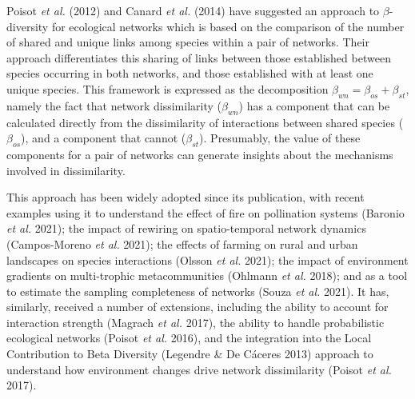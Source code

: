 \documentclass[11pt]{article}
\begin{document}
Poisot \emph{et al.} (2012) and Canard \emph{et al.} (2014) have
suggested an approach to \(\beta\)-diversity for ecological networks
which is based on the comparison of the number of shared and unique
links among species within a pair of networks. Their approach
differentiates this sharing of links between those established between
species occurring in both networks, and those established with at least
one unique species. This framework is expressed as the decomposition
\(\beta_{wn} = \beta_{os} + \beta_{st}\), namely the fact that network
dissimilarity (\(\beta_{wn}\)) has a component that can be calculated
directly from the dissimilarity of interactions between shared species
(\(\beta_{os}\)), and a component that cannot (\(\beta_{st}\)).
Presumably, the value of these components for a pair of networks can
generate insights about the mechanisms involved in dissimilarity.

This approach has been widely adopted since its publication, with recent
examples using it to understand the effect of fire on pollination
systems (Baronio \emph{et al.} 2021); the impact of rewiring on
spatio-temporal network dynamics (Campos-Moreno \emph{et al.} 2021); the
effects of farming on rural and urban landscapes on species interactions
(Olsson \emph{et al.} 2021); the impact of environment gradients on
multi-trophic metacommunities (Ohlmann \emph{et al.} 2018); and as a
tool to estimate the sampling completeness of networks (Souza \emph{et
al.} 2021). It has, similarly, received a number of extensions,
including the ability to account for interaction strength (Magrach
\emph{et al.} 2017), the ability to handle probabilistic ecological
networks (Poisot \emph{et al.} 2016), and the integration into the Local
Contribution to Beta Diversity (Legendre \& De Cáceres 2013) approach to
understand how environment changes drive network dissimilarity (Poisot
\emph{et al.} 2017).
\end{document}
